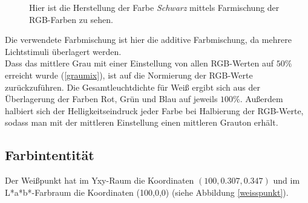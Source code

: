\documentclass[11pt]{article}
\begin{document}
{\begin{minipage}[t]{0.6\textwidth}
\begin{figure}[H]
\caption{Hier ist die Herstellung der Farbe \textit{Schwarz} mittels Farmischung der RGB-Farben zu sehen.}
\label{schwarzmix}
\end{figure}
\end{minipage}  }
Die verwendete Farbmischung ist hier die additive Farbmischung, da mehrere Lichtstimuli überlagert werden. \\

Dass das mittlere Grau mit einer Einstellung von allen RGB-Werten auf $50\%$ erreicht wurde (\ref{graumix}), ist auf die Normierung der RGB-Werte zurückzuführen. Die Gesamtleuchtdichte für Weiß ergibt sich aus der Überlagerung der Farben Rot, Grün und Blau auf jeweils $100\%$. Außerdem halbiert sich der Helligkeitseindruck jeder Farbe bei Halbierung der RGB-Werte, sodass man mit der mittleren Einstellung einen mittleren Grauton erhält. 


\subsection{Farbintentität}
Der Weißpunkt hat im Yxy-Raum die Koordinaten $(100,0.307,0.347)$ und im L*a*b*-Farbraum die Koordinaten (100,0,0) (siehe Abbildung \ref{weisspunkt}).  \\
\end{document}
